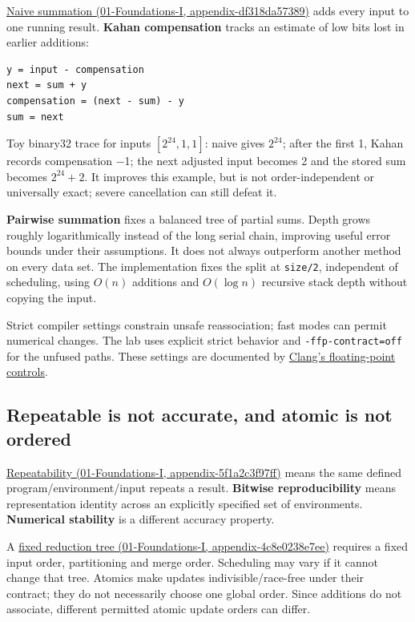 \href{../01-Foundations-I/main.pdf\#nameddest=appendix-df318da57389}{Naive summation (01-Foundations-I, appendix-df318da57389)} adds every input to one running result. \textbf{Kahan compensation} tracks an estimate of low bits lost in earlier additions:

\begin{verbatim}
y = input - compensation
next = sum + y
compensation = (next - sum) - y
sum = next
\end{verbatim}

Toy binary32 trace for inputs \([2^{24},1,1]\): naive gives \(2^{24}\); after the first 1, Kahan records compensation −1; the next adjusted input becomes 2 and the stored sum becomes \(2^{24}+2\). It improves this example, but is not order-independent or universally exact; severe cancellation can still defeat it.

\textbf{Pairwise summation} fixes a balanced tree of partial sums. Depth grows roughly logarithmically instead of the long serial chain, improving useful error bounds under their assumptions. It does not always outperform another method on every data set. The implementation fixes the split at \texttt{size/2}, independent of scheduling, using \(O(n)\) additions and \(O(\log n)\) recursive stack depth without copying the input.

Strict compiler settings constrain unsafe reassociation; fast modes can permit numerical changes. The lab uses explicit strict behavior and \texttt{-ffp-contract=off} for the unfused paths. These settings are documented by \href{https://clang.llvm.org/docs/UsersManual.html\#controlling-floating-point-behavior}{Clang's floating-point controls}.

\subsection{Repeatable is not accurate, and atomic is not ordered}\label{05-engine-i-ch001-repeatable-is-not-accurate-and-atomic-is-not-ordered}

\href{../01-Foundations-I/main.pdf\#nameddest=appendix-5f1a2c3f97ff}{Repeatability (01-Foundations-I, appendix-5f1a2c3f97ff)} means the same defined program/environment/input repeats a result. \textbf{Bitwise reproducibility} means representation identity across an explicitly specified set of environments. \textbf{Numerical stability} is a different accuracy property.

A \href{../01-Foundations-I/main.pdf\#nameddest=appendix-4c8e0238e7ee}{fixed reduction tree (01-Foundations-I, appendix-4c8e0238e7ee)} requires a fixed input order, partitioning and merge order. Scheduling may vary if it cannot change that tree. Atomics make updates indivisible/race-free under their contract; they do not necessarily choose one global order. Since additions do not associate, different permitted atomic update orders can differ.

